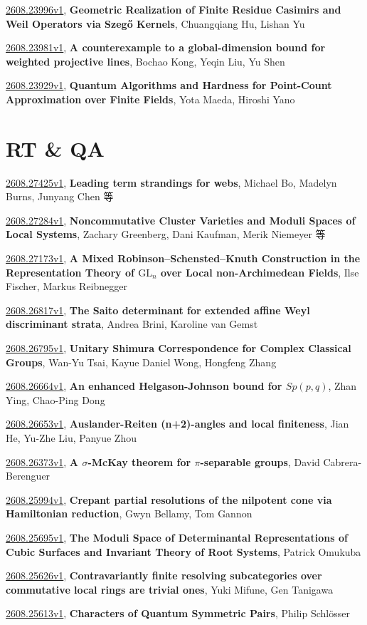 \documentclass[9pt, a4paper]{article}
\theoremstyle{plain}
\theoremstyle{definition}
\theoremstyle{remark}
\newcommand{\arxiv}[3]{\href{https://arxiv.org/abs/#1}{#1}, \textbf{\textcolor{arxivblue}{#2}}, #3}
\begin{document}
\arxiv{2608.23996v1}{Geometric Realization of Finite Residue Casimirs and Weil Operators via Szegő Kernels}{Chuangqiang Hu, Lishan Yu}

\arxiv{2608.23981v1}{A counterexample to a global-dimension bound for weighted projective lines}{Bochao Kong, Yeqin Liu, Yu Shen}

\arxiv{2608.23929v1}{Quantum Algorithms and Hardness for Point-Count Approximation over Finite Fields}{Yota Maeda, Hiroshi Yano}


\section{RT \& QA}
\arxiv{2608.27425v1}{Leading term strandings for webs}{Michael Bo, Madelyn Burns, Junyang Chen 等}

\arxiv{2608.27284v1}{Noncommutative Cluster Varieties and Moduli Spaces of Local Systems}{Zachary Greenberg, Dani Kaufman, Merik Niemeyer 等}

\arxiv{2608.27173v1}{A Mixed Robinson--Schensted--Knuth Construction in the Representation Theory of $\mathrm{GL}_n$ over Local non-Archimedean Fields}{Ilse Fischer, Markus Reibnegger}

\arxiv{2608.26817v1}{The Saito determinant for extended affine Weyl discriminant strata}{Andrea Brini, Karoline van Gemst}

\arxiv{2608.26795v1}{Unitary Shimura Correspondence for Complex Classical Groups}{Wan-Yu Tsai, Kayue Daniel Wong, Hongfeng Zhang}

\arxiv{2608.26664v1}{An enhanced Helgason-Johnson bound for $Sp(p, q)$}{Zhan Ying, Chao-Ping Dong}

\arxiv{2608.26653v1}{Auslander-Reiten (n+2)-angles and local finiteness}{Jian He, Yu-Zhe Liu, Panyue Zhou}

\arxiv{2608.26373v1}{A $σ$-McKay theorem for $π$-separable groups}{David Cabrera-Berenguer}

\arxiv{2608.25994v1}{Crepant partial resolutions of the nilpotent cone via Hamiltonian reduction}{Gwyn Bellamy, Tom Gannon}

\arxiv{2608.25695v1}{The Moduli Space of Determinantal Representations of Cubic Surfaces and Invariant Theory of Root Systems}{Patrick Omukuba}

\arxiv{2608.25626v1}{Contravariantly finite resolving subcategories over commutative local rings are trivial ones}{Yuki Mifune, Gen Tanigawa}

\arxiv{2608.25613v1}{Characters of Quantum Symmetric Pairs}{Philip Schlösser}
\end{document}
